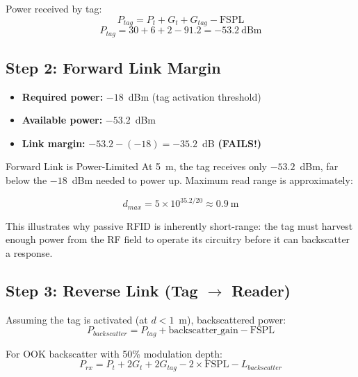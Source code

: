 Power received by tag:
\begin{equation}
P_{tag} = P_t + G_t + G_{tag} - \mathrm{FSPL}
\end{equation}
\begin{equation}
P_{tag} = 30 + 6 + 2 - 91.2 = -53.2~\text{dBm}
\end{equation}

\subsection*{Step 2: Forward Link Margin}

\begin{itemize}
\item \textbf{Required power:} $-18$~dBm (tag activation threshold)
\item \textbf{Available power:} $-53.2$~dBm
\item \textbf{Link margin:} $-53.2 - (-18) = -35.2$~dB \textbf{(FAILS!)}
\end{itemize}

\begin{calloutbox}[colback=red!10!white,colframe=red]{Forward Link is Power-Limited}
At 5~m, the tag receives only $-53.2$~dBm, far below the $-18$~dBm needed to power up. Maximum read range is approximately:

\begin{equation}
d_{max} = 5 \times 10^{35.2/20} \approx 0.9~\text{m}
\end{equation}

This illustrates why passive RFID is inherently short-range: the tag must harvest enough power from the RF field to operate its circuitry before it can backscatter a response.
\end{calloutbox}

\subsection*{Step 3: Reverse Link (Tag $\rightarrow$ Reader)}

Assuming the tag is activated (at $d < 1$~m), backscattered power:
\begin{equation}
P_{backscatter} = P_{tag} + \mathrm{backscatter\_gain} - \mathrm{FSPL}
\end{equation}

For OOK backscatter with 50\% modulation depth:
\begin{equation}
P_{rx} = P_t + 2G_t + 2G_{tag} - 2 \times \mathrm{FSPL} - L_{backscatter}
\end{equation}


